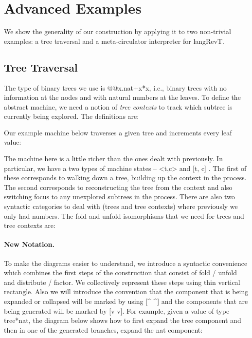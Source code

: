 \documentclass{llncs}
\begin{document}
{%
\section{Advanced Examples} 

We show the generality of our construction by applying it to two non-trivial
examples: a tree traversal and a meta-circulator interpreter for
{{langRevT}}.

\subsection{Tree Traversal}

The type of binary trees we use is {{@@x.nat+x*x}}, i.e., binary trees with
no information at the nodes and with natural numbers at the leaves. To define
the abstract machine, we need a notion of \emph{tree contexts} to track which
subtree is currently being explored. The definitions are:

%

Our example machine below traverses a given tree and increments every leaf
value:


The machine here is a little richer than the ones dealt with
previously. In particular, we have a two types of machine states --
{{<t,c>}} and {{ {[t, c]} }}. The first of these corresponds to walking
down a tree, building up the context in the process. The second
corresponds to reconstructing the tree from the context and also
switching focus to any unexplored subtrees in the process. There are
also two syntactic categories to deal with (trees and tree contexts)
where previously we only had numbers. The {{fold}} and {{unfold}}
isomorphisms that we need for trees and tree contexts are:


\paragraph*{New Notation.}
To make the diagrams easier to understand, we introduce a syntactic
convenience which combines the first steps of the construction that consist
of {{fold}} / {{unfold}} and {{distribute}} / {{factor}}. We collectively
represent these steps using thin vertical rectangle. Also we will introduce
the convention that the component that is being expanded or collapsed will be
marked by using {{[^ ^]}} and the components that are being generated will be
marked by {{[v v]}}. For example, given a value of type {{tree*nat}}, the
diagram below shows how to first expand the {{tree}} component and then in
one of the generated branches, expand the {{nat}} component:

}
\end{document}
